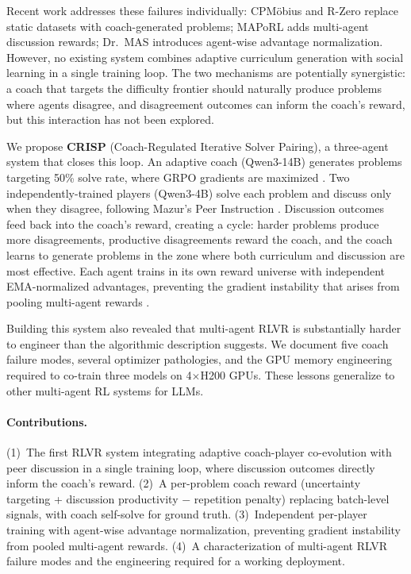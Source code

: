 \documentclass{article}
\begin{document}
Recent work addresses these failures individually: CPM\"{o}bius \citep{li2026cpmobius} and R-Zero \citep{huang2025rzero} replace static datasets with coach-generated problems; MAPoRL \citep{park2025maporl} adds multi-agent discussion rewards; Dr.~MAS \citep{zhu2025drmas} introduces agent-wise advantage normalization. However, no existing system combines adaptive curriculum generation with social learning in a single training loop. The two mechanisms are potentially synergistic: a coach that targets the difficulty frontier should naturally produce problems where agents disagree, and disagreement outcomes can inform the coach's reward, but this interaction has not been explored.

We propose \textbf{CRISP} (Coach-Regulated Iterative Solver Pairing), a three-agent system that closes this loop. An adaptive coach (Qwen3-14B) generates problems targeting 50\% solve rate, where GRPO gradients are maximized \citep{pcl2025}. Two independently-trained players (Qwen3-4B) solve each problem and discuss only when they disagree, following Mazur's Peer Instruction \citep{crouch2001peer}. Discussion outcomes feed back into the coach's reward, creating a cycle: harder problems produce more disagreements, productive disagreements reward the coach, and the coach learns to generate problems in the zone where both curriculum and discussion are most effective. Each agent trains in its own reward universe with independent EMA-normalized advantages, preventing the gradient instability that arises from pooling multi-agent rewards \citep{zhu2025drmas}.

Building this system also revealed that multi-agent RLVR is substantially harder to engineer than the algorithmic description suggests. We document five coach failure modes, several optimizer pathologies, and the GPU memory engineering required to co-train three models on 4$\times$H200 GPUs. These lessons generalize to other multi-agent RL systems for LLMs.

\paragraph{Contributions.}
(1)~The first RLVR system integrating adaptive coach-player co-evolution with peer discussion in a single training loop, where discussion outcomes directly inform the coach's reward.
(2)~A per-problem coach reward (uncertainty targeting + discussion productivity $-$ repetition penalty) replacing batch-level signals, with coach self-solve for ground truth.
(3)~Independent per-player training with agent-wise advantage normalization, preventing gradient instability from pooled multi-agent rewards.
(4)~A characterization of multi-agent RLVR failure modes and the engineering required for a working deployment.
\end{document}
